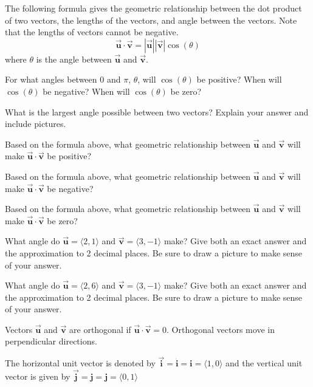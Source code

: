 \begin{info} The following formula gives the geometric relationship between the dot product of two vectors, the lengths of the vectors, and angle between the vectors. Note that the lengths of vectors cannot be negative. $$\vec{\textbf{u}} \cdot \vec{\textbf{v}}= |\vec{\textbf{u}}| | \vec{\textbf{v}}| \cos(\theta)$$
where $\theta$ is the angle between $\vec{\textbf{u}}$ and $\vec{\textbf{v}}$.
\end{info}

\bq \be
\item For what angles between $0$ and $\pi$, $\theta$, will $\cos(\theta)$ be positive? When will $\cos(\theta)$ be negative? When will $\cos(\theta)$ be zero?
\item What is the largest angle possible between two vectors? Explain your answer and include pictures.
\item Based on the formula above, what geometric relationship between $\vec{\textbf{u}}$ and $\vec{\textbf{v}}$ will make $\vec{\textbf{u}} \cdot \vec{\textbf{v}}$ be positive?
\item Based on the formula above, what geometric relationship between $\vec{\textbf{u}}$ and $\vec{\textbf{v}}$ will make $\vec{\textbf{u}} \cdot \vec{\textbf{v}}$ be negative?
\item Based on the formula above, what geometric relationship between $\vec{\textbf{u}}$ and $\vec{\textbf{v}}$ will make $\vec{\textbf{u}} \cdot \vec{\textbf{v}}$ be zero?
\ee \eq

\bq What angle do $\vec{\textbf{u}}=\langle 2,1\rangle$ and $\vec{\textbf{v}}=\langle 3,-1\rangle$ make? Give both an exact answer and the approximation to 2 decimal places. Be sure to draw a picture to make sense of your answer.
\eq

\bq What angle do $\vec{\textbf{u}}=\langle 2,6\rangle$ and $\vec{\textbf{v}}=\langle 3,-1\rangle$ make? Give both an exact answer and the approximation to 2 decimal places. Be sure to draw a picture to make sense of your answer.
\eq
\begin{info} Vectors $\vec{\textbf{u}}$ and $\vec{\textbf{v}}$ are orthogonal if $\vec{\textbf{u}} \cdot \vec{\textbf{v}}= 0$. Orthogonal vectors move in perpendicular directions.

The horizontal unit vector is denoted by $\vec{\textbf{i}}= \hat{\textbf{i}}= \textbf{i}= \langle 1,0\rangle$ and the vertical unit vector is given by $\vec{\textbf{j}}= \hat{\textbf{j}}= \textbf{j}=\langle 0,1\rangle$
\end{info}

